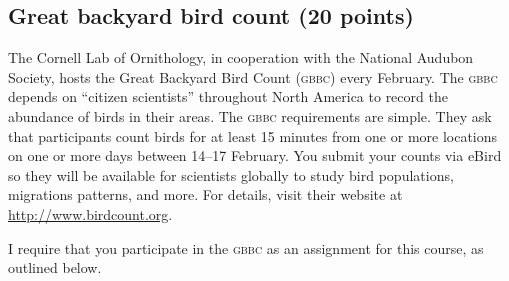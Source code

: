 \documentclass[11pt]{article}
\begin{document}
\thispagestyle{plain}

\subsection*{Great backyard bird count (20 points)}

The Cornell Lab of Ornithology, in cooperation with the National Audubon Society, hosts the Great Backyard Bird Count \textsc{(gbbc)} every February. The \textsc{gbbc} depends on ``citizen scientists'' throughout North America to record the abundance of birds in their areas. The \textsc{gbbc} requirements are simple. They ask that participants count birds for at least 15 minutes from one or more locations on one or more days between 14--17 February. You submit your counts via eBird so they will be available for scientists globally to study bird populations, migrations patterns, and more.  For details, visit their website at \url{http://www.birdcount.org}.\medskip

I require that you participate in the \textsc{gbbc} as an assignment for this course, as outlined below.
\end{document}
